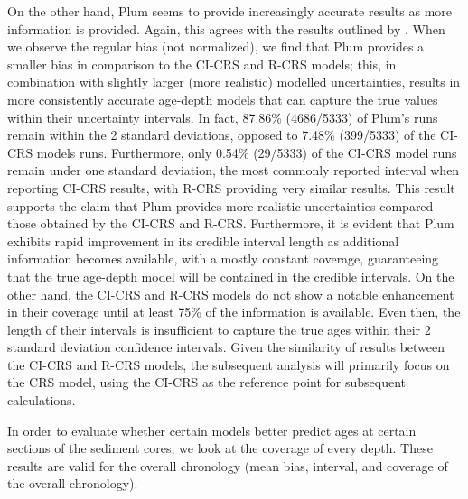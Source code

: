 \documentclass [10pt] {article}
\begin{document}
On the other hand, Plum seems to provide increasingly accurate results as more information is provided.
Again, this agrees with the results outlined by \citet{Blaauw2018}. 
When we observe the regular bias (not normalized), we find that Plum provides a smaller bias in comparison to the CI-CRS and R-CRS models; this, in combination with slightly larger (more realistic) modelled uncertainties, results in more consistently accurate age-depth models that can capture the true values within their uncertainty intervals. 
In fact, 87.86\% (4686/5333) of Plum's runs remain within the 2 standard deviations, opposed to 7.48\% (399/5333) of the CI-CRS models runs. 
Furthermore, only 0.54\% (29/5333) of the CI-CRS model runs remain under one standard deviation, the most commonly reported interval when reporting CI-CRS results, with R-CRS providing very similar results.
This result supports the claim that Plum provides more realistic uncertainties compared those obtained by the CI-CRS and R-CRS. 
Furthermore, it is evident that Plum exhibits rapid improvement in its credible interval length as additional information becomes available, with a mostly constant coverage, guaranteeing that the true age-depth model will be contained in the credible intervals. On the other hand, the CI-CRS and R-CRS models do not show a notable enhancement in their coverage until at least 75\% of the information is available. Even then, the length of their intervals is insufficient to capture the true ages within their 2 standard deviation confidence intervals. Given the similarity of results between the CI-CRS and R-CRS models, the subsequent analysis will primarily focus on the CRS model, using the CI-CRS as the reference point for subsequent calculations.


In order to evaluate whether certain models better predict ages at certain sections of the sediment cores, we look at the coverage of every depth. These results are valid for the overall chronology (mean bias, interval, and coverage of the overall chronology).
\end{document}
